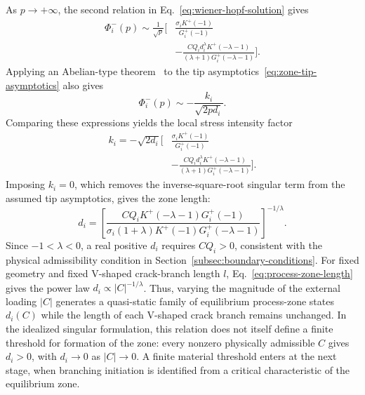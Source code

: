 \documentclass[pdflatex,iicol,sn-mathphys-ay]{sn-jnl}
\begin{document}
As $p\to+\infty$, the second relation in
Eq.~\eqref{eq:wiener-hopf-solution} gives
{\small
\begin{equation*}
\begin{aligned}
  \Phi_i^-(p)\sim\frac{1}{\sqrt{p}}
  \Bigg[
    &\frac{\sigma_iK^+(-1)}{G_i^+(-1)}\\[-1pt]
    &-\frac{CQ_i d_i^\lambda K^+(-\lambda-1)}
    {(\lambda+1)G_i^+(-\lambda-1)}
  \Bigg].
\end{aligned}
\end{equation*}
}
Applying an Abelian-type theorem~\citep{noble1958wienerhopf} to the
tip asymptotics~\eqref{eq:zone-tip-asymptotics} also gives
\begin{equation*}
  \Phi_i^-(p)\sim-\frac{k_i}{\sqrt{2pd_i}}.
\end{equation*}
Comparing these expressions yields the local stress intensity factor
{\small
\begin{equation*}
\begin{aligned}
  k_i=-\sqrt{2d_i}\Bigg[
    &\frac{\sigma_iK^+(-1)}{G_i^+(-1)}\\[-1pt]
    &-\frac{CQ_i d_i^\lambda K^+(-\lambda-1)}
    {(\lambda+1)G_i^+(-\lambda-1)}
  \Bigg].
\end{aligned}
\end{equation*}
}
Imposing $k_i=0$, which removes the inverse-square-root singular term
from the assumed tip asymptotics, gives the zone length:
\begin{equation}
\label{eq:process-zone-length}
  d_i=
  \left[
    \frac{CQ_iK^+(-\lambda-1)G_i^+(-1)}
    {\sigma_i(1+\lambda)K^+(-1)G_i^+(-\lambda-1)}
  \right]^{-1/\lambda}.
\end{equation}
Since $-1<\lambda<0$, a real positive $d_i$ requires $CQ_i>0$,
consistent with the physical admissibility condition in
Section~\ref{subsec:boundary-conditions}. For fixed geometry and fixed
V-shaped crack-branch length $l$, Eq.~\eqref{eq:process-zone-length}
gives the power law
$d_i\propto |C|^{-1/\lambda}$. Thus, varying the magnitude of the
external loading $|C|$ generates a quasi-static family of equilibrium
process-zone states $d_i(C)$ while the length of each V-shaped crack
branch remains unchanged. In the idealized singular formulation, this
relation does not itself define a finite threshold for formation of the
zone: every nonzero physically admissible $C$ gives $d_i>0$, with
$d_i\to0$ as $|C|\to0$. A finite material threshold enters at the next
stage, when branching initiation is identified from a critical
characteristic of the equilibrium zone.
\end{document}
